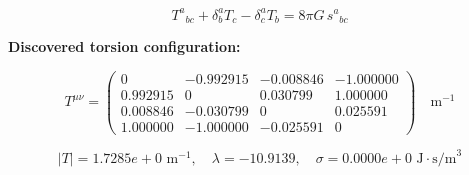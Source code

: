 
\begin{equation}
  T^a{}_{bc} + \delta^a_b T_c - \delta^a_c T_b = 8\pi G \, s^a{}_{bc}
\end{equation}

\textbf{Discovered torsion configuration:}

\begin{equation}
  T^{\mu\nu} = \begin{pmatrix}
    0 & -0.992915 & -0.008846 & -1.000000 \\
    0.992915 & 0 & 0.030799 & 1.000000 \\
    0.008846 & -0.030799 & 0 & 0.025591 \\
    1.000000 & -1.000000 & -0.025591 & 0
  \end{pmatrix} \quad \text{m}^{-1}
\end{equation}

\begin{equation}
  |T| = 1.7285e+0 \text{ m}^{-1}, \quad
  \lambda = -10.9139, \quad
  \sigma = 0.0000e+0 \text{ J}\cdot\text{s/m}^3
\end{equation}